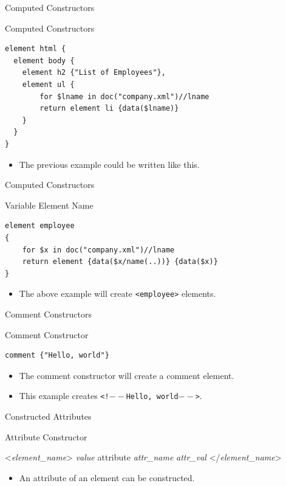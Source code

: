 \documentclass[svgnames]{beamer}
\begin{document}
\begin{frame}[fragile]{Computed Constructors}
\small
\begin{block}{Computed Constructors}
\begin{verbatim}
element html {
  element body {
    element h2 {"List of Employees"},
    element ul {
        for $lname in doc("company.xml")//lname
        return element li {data($lname)}
    }
  }
}
\end{verbatim}
\end{block}
\normalsize
\begin{itemize}
	\item The previous example could be written like this.
\end{itemize}
\end{frame}

\begin{frame}[fragile]{Computed Constructors}
\small
\begin{block}{Variable Element Name}
\begin{verbatim}
element employee
{
    for $x in doc("company.xml")//lname
    return element {data($x/name(..))} {data($x)}
}
\end{verbatim}
\end{block}
\normalsize
\begin{itemize}
	\item The above example will create \texttt{<employee>} elements.
\end{itemize}
\end{frame}

\begin{frame}[fragile]{Comment Constructors}
\small
\begin{block}{Comment Constructor}
\begin{verbatim}
comment {"Hello, world"}
\end{verbatim}
\end{block}
\normalsize
\begin{itemize}
	\item The comment constructor will create a comment element.
	\item This example creates \texttt{<!$--$Hello, world$--$>}.
\end{itemize}
\end{frame}

\begin{frame}[fragile]{Constructed Attributes}
\small
\begin{block}{Attribute Constructor}
\begin{semiverbatim}
<\textit{element_name}>
    \textit{value} {attribute \textit{attr_name} \textit{attr_val}}
</\textit{element_name}>
\end{semiverbatim}
\end{block}
\normalsize
\begin{itemize}
	\item An attribute of an element can be constructed.
\end{itemize}
\end{frame}
\end{document}
